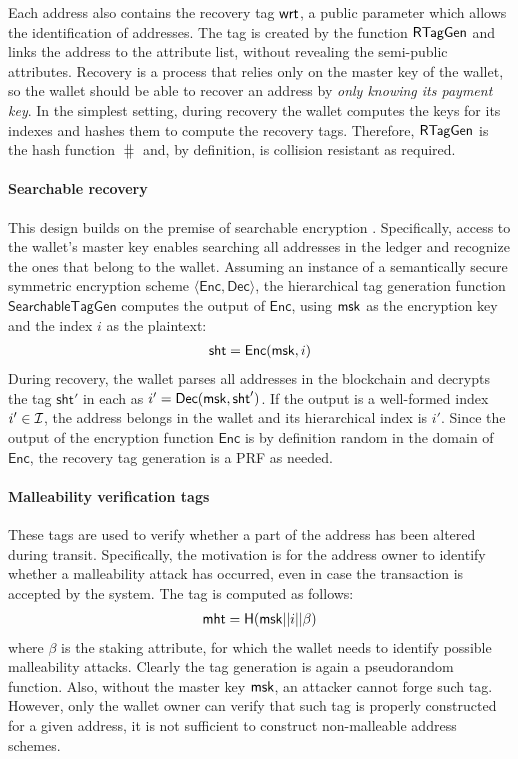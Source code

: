 Each address also contains the recovery tag $\mathsf{wrt}$, \ie a public parameter which
allows the identification of addresses. The tag is created by the function
$\mathsf{RTagGen}$ and links the address to the attribute list, without
revealing the semi-public attributes.  Recovery is a process that relies only
on the master key of the wallet, so the wallet should be able to recover an
address by \emph{only knowing its payment key}. In the simplest setting, during
recovery the wallet computes the keys for its indexes and hashes them to
compute the recovery tags. Therefore, $\mathsf{RTagGen}$ is the hash
function $\hash$ and, by definition, is collision resistant as required.

\paragraph{Searchable recovery}\label{subsubsec:searchable_tags}
This design builds on the premise of searchable encryption
\cite{C:BelBolONe07}. Specifically, access to the wallet's master key enables
searching all addresses in the ledger and recognize the ones that belong to the
wallet.  Assuming an instance of a semantically secure symmetric encryption
scheme $\langle \mathsf{Enc, Dec} \rangle$, the hierarchical tag generation
function $\mathsf{SearchableTagGen}$ computes the output of $\mathsf{Enc}$,
using $\mathsf{msk}$ as the encryption key and the index $i$ as the plaintext:
\begin{align}
    \mathsf{sht} = \mathsf{Enc}(\mathsf{msk}, i)
\end{align}
During recovery, the wallet parses all addresses in the blockchain and decrypts
the tag $\mathsf{sht}'$ in each as $i^\prime = \mathsf{Dec}(\mathsf{msk}, \mathsf{sht}')$. If
the output is a well-formed index $i' \in \mathcal{I}$, the address
belongs in the wallet and its hierarchical index is $i'$. Since the
output of the encryption function $\mathsf{Enc}$ is by definition random in the
domain of $\mathsf{Enc}$, the recovery tag generation is a PRF as needed.

\paragraph{Malleability verification tags}\label{subsubsec:verifiable_malleability_tags}
These tags are used to verify whether a part of the address
has been altered during transit. Specifically, the motivation is for the
address owner to identify whether a malleability attack has occurred, even in
case the transaction is accepted by the system.  The tag is computed as
follows:
\begin{align}
    \mathsf{mht} = \mathsf{H}(\mathsf{msk} || i || \beta)
\end{align}
where $\beta$ is the staking attribute, for which the wallet needs to identify
possible malleability attacks. Clearly the tag generation is again a
pseudorandom function. Also, without the master key $\mathsf{msk}$, an attacker cannot
forge such tag. However, only the wallet owner can verify that such tag is
properly constructed for a given address, \ie it is not sufficient to construct
non-malleable address schemes.

